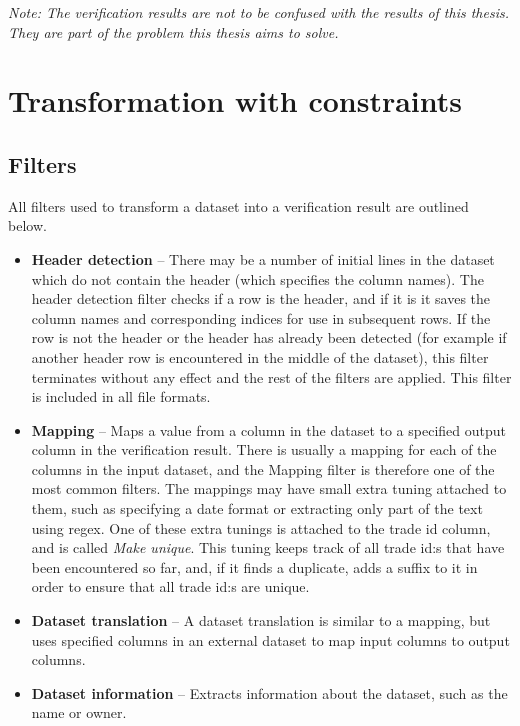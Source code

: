 \textit{Note: The verification results are not to be confused with the results of this thesis. They are part of the problem this thesis aims to solve.}

\section{Transformation with constraints}

\subsection{Filters}
All filters used to transform a dataset into a verification result are outlined below.

\begin{itemize}
\item \textbf{Header detection} --
There may be a number of initial lines in the dataset which do not contain the header (which specifies the column names). The header detection filter checks if a row is the header,
and if it is it saves the column names and corresponding indices for use in subsequent rows. If the row is not the header or the header has already been detected
(for example if another header row is encountered in the middle of the dataset), this filter terminates without any effect and the rest of the filters are applied.
This filter is included in all file formats.

\item \textbf{Mapping} --
Maps a value from a column in the dataset to a specified output column in the verification result. There is usually a mapping for each of the columns in the input
dataset, and the Mapping filter is therefore one of the most common filters. The mappings may have small extra tuning attached to them, such as specifying a date
format or extracting only part of the text using regex. One of these extra tunings is attached to the trade id column, and is called \textit{Make unique}.
This tuning keeps track of all trade id:s that have been encountered so far, and, if it finds a duplicate, adds a suffix to it in order to ensure that all trade id:s are unique.

\item \textbf{Dataset translation} --
A dataset translation is similar to a mapping, but uses specified columns in an external dataset to map input columns to output columns.

\item \textbf{Dataset information} --
Extracts information about the dataset, such as the name or owner.


\end{itemize}
